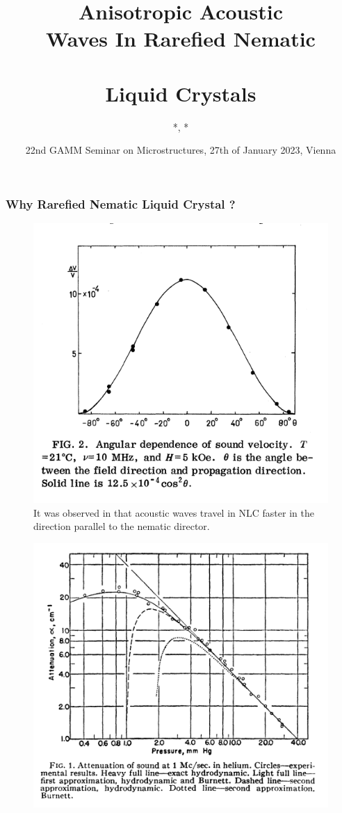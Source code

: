 \documentclass{beamer}
\title[Acoustic Rarefied Nematic Liquid Crystals]{Anisotropic Acoustic \vspace{0.1cm}\\ Waves In Rarefied Nematic\\ \\Liquid Crystals} %
\author%
{%
	\sc{P. E. Farrell} *, \underline{\sc{U. Zerbinati}} *\\
}
\institute%
{%
	* \textit{Mathematical Institute}\\
	\;\textit{University of Oxford}\\
}
\date[Firedrake 2023]{22nd GAMM Seminar on Microstructures, 27th of January 2023, Vienna} %
\begin{document}
	\begin{frame}[plain]
		\titlepage
	\end{frame}
	\begin{frame}
		\frametitle{Why Rarefied Nematic Liquid Crystal ?}
		\begin{minipage}{0.49\textwidth}
			\vspace{0.8cm}
			\begin{figure}
				\includegraphics[scale=0.25]{Figures/MullenLuthiStephen}
				\vspace{-0.4cm}
				\caption{It was observed in \cite{MullenEtAll} that acoustic waves travel in NLC faster in the direction parallel to the nematic director.}
			\end{figure}
		\end{minipage}
		\begin{minipage}{0.49\textwidth}
			\vspace{1cm}
			\begin{figure}
				\includegraphics[scale=0.25]{Figures/Greenspan}

\end{figure}
\end{minipage}
\end{frame}
\end{document}
